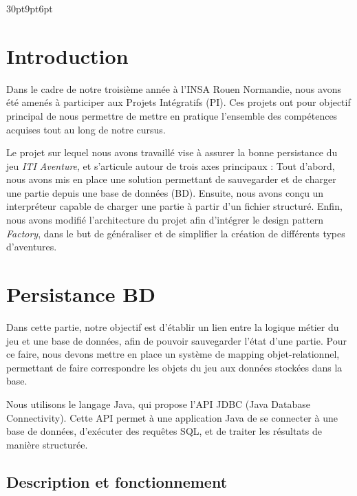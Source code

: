 \documentclass[a4paper, 12pt]{report}
\begin{document}
\titlespacing*{\subsection}
    {30pt}{9pt}{6pt}

\newpage

\tableofcontents

\newpage

\chapter{Introduction}

Dans le cadre de notre troisième année à l’INSA Rouen Normandie, nous avons été amenés à participer aux Projets Intégratifs (PI). 
Ces projets ont pour objectif principal de nous permettre de mettre en pratique l’ensemble des compétences acquises tout au long de notre cursus.

Le projet sur lequel nous avons travaillé vise à assurer la bonne persistance du jeu \textit{ITI Aventure}, et s’articule autour de trois axes principaux :
Tout d’abord, nous avons mis en place une solution permettant de sauvegarder et de charger une partie depuis une base de données (BD).
Ensuite, nous avons conçu un interpréteur capable de charger une partie à partir d’un fichier structuré.
Enfin, nous avons modifié l’architecture du projet afin d’intégrer le design pattern \textit{Factory}, dans le but de généraliser et de simplifier la création de différents types d’aventures.



\chapter{Persistance BD}

Dans cette partie, notre objectif est d’établir un lien entre la logique métier du jeu et une base de données, 
afin de pouvoir sauvegarder l’état d’une partie. Pour ce faire, nous devons mettre en place un système de mapping objet-relationnel, permettant de 
faire correspondre les objets du jeu aux données stockées dans la base.

Nous utilisons le langage Java, qui propose l’API JDBC (Java Database Connectivity). 
Cette API permet à une application Java de se connecter à une base de données, d’exécuter des requêtes SQL, 
et de traiter les résultats de manière structurée.

\section{Description et fonctionnement}
\end{document}

